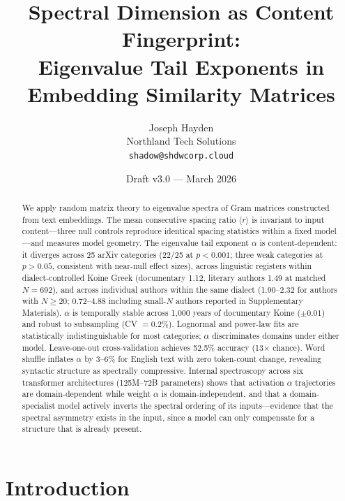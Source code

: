 \documentclass[12pt,letterpaper]{article}
\title{Spectral Dimension as Content Fingerprint:\\
Eigenvalue Tail Exponents in Embedding Similarity Matrices}
\author{Joseph Hayden \\
Northland Tech Solutions \\
\texttt{shadow@shdwcorp.cloud}}
\date{Draft v3.0 --- March 2026}
\newcommand{\rbar}{\langle r \rangle}
\newcommand{\al}{\alpha}
\begin{document}
\maketitle

\begin{abstract}

We apply random matrix theory to eigenvalue spectra of Gram matrices
constructed from text embeddings.  The mean consecutive spacing ratio
$\rbar$ is invariant to input content---three null controls reproduce
identical spacing statistics within a fixed model---and measures
model geometry.  The eigenvalue tail exponent $\al$ is
content-dependent: it diverges across 25 arXiv categories (22/25 at
$p < 0.001$; three weak categories at $p > 0.05$, consistent with
near-null effect sizes), across linguistic registers within
dialect-controlled Koine Greek (documentary 1.12, literary authors
1.49 at matched $N = 692$), and across individual authors within
the same dialect (1.90--2.32 for authors with $N \geq 20$;
0.72--4.88 including small-$N$ authors reported in Supplementary
Materials).  $\al$ is temporally stable across 1{,}000 years
of documentary Koine ($\pm 0.01$) and robust to subsampling
(CV $= 0.2\%$).  Lognormal and power-law fits are statistically
indistinguishable for most categories; $\al$ discriminates domains
under either model.
Leave-one-out cross-validation achieves 52.5\% accuracy
(13$\times$ chance).  Word shuffle inflates $\al$ by 3--6\% for
English text with zero token-count change, revealing syntactic
structure as spectrally compressive.  Internal spectroscopy across
six transformer architectures (125M--72B parameters) shows that
activation $\al$ trajectories are domain-dependent while weight
$\al$ is domain-independent, and that a domain-specialist model
actively inverts the spectral ordering of its inputs---evidence
that the spectral asymmetry exists in the input, since a model
can only compensate for a structure that is already present.

\end{abstract}

\section{Introduction}
\label{sec:intro}
\end{document}
